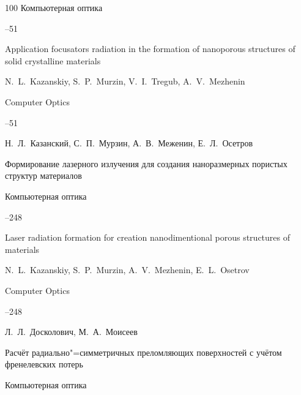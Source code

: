 \begin{thebibliography}{100}
\jour Компьютерная оптика




--51

\misctransl

\paper Application focusators radiation in the formation of nanoporous structures of solid crystalline materials

\by N.~L.~Kazanskiy, S.~P.~Murzin, V.~I.~Tregub, A.~V.~Mezhenin

\jour Computer Optics




--51










\by Н.~Л.~Казанский, С.~П.~Мурзин, А.~В.~Меженин, Е.~Л.~Осетров

\paper Формирование лазерного излучения для создания наноразмерных пористых структур материалов

\jour Компьютерная оптика




--248

\misctransl

\paper Laser radiation formation for creation nanodimentional porous structures of materials

\by N.~L.~Kazanskiy, S.~P.~Murzin, A.~V.~Mezhenin, E.~L.~Osetrov

\jour Computer Optics




--248






\by Л.~Л.~Досколович, М.~А.~Моисеев

\paper Расчёт радиально"=симметричных преломляющих поверхностей с учётом френелевских потерь 

\jour Компьютерная оптика



\end{thebibliography}
